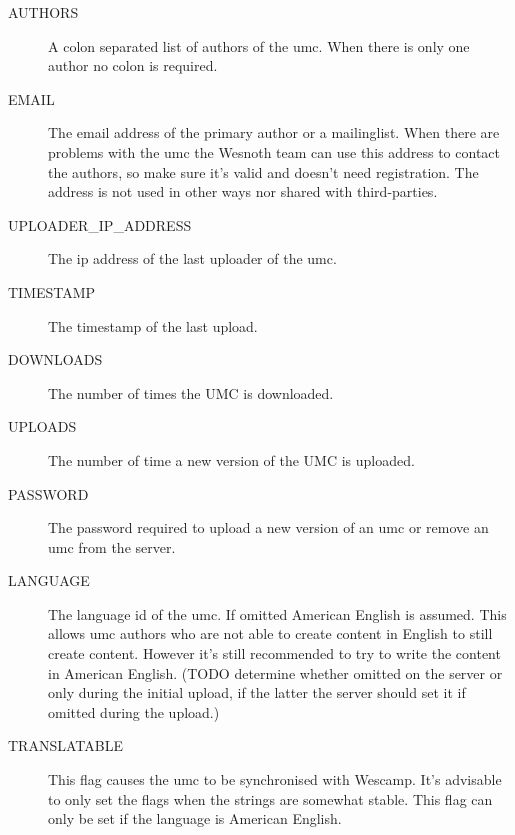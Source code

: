 \begin{description}
\item[AUTHORS]
	A colon separated list of authors of the umc. When there is only one
	author no colon is required.

\item[EMAIL]
	The email address of the primary author or a mailinglist. When there are
	problems with the umc the Wesnoth team can use this address to contact
	the authors, so make sure it's valid and doesn't need registration.
	The address is not used in other ways nor shared with third-parties.

\item[UPLOADER\_IP\_ADDRESS]
	The ip address of the last uploader of the umc.

\item[TIMESTAMP]
	The timestamp of the last upload. 

\item[DOWNLOADS]
	The number of times the UMC is downloaded.

\item[UPLOADS]
	The number of time a new version of the UMC is uploaded.

\item[PASSWORD]
	The password required to upload a new version of an umc or remove an umc
	from the server.

\item[LANGUAGE]
	The language id of the umc. If omitted American English is assumed.
	This allows umc authors who are not able to create content in English to
	still create content. However it's still recommended to try to write the
	content in American English. (TODO determine whether omitted on the
	server or only during the initial upload, if the latter the server
	should set it if omitted during the upload.)

\item[TRANSLATABLE]
	This flag causes the umc to be synchronised with Wescamp. It's advisable
	to only set the flags when the strings are somewhat stable. This flag
	can only be set if the language is American English.
\end{description}

